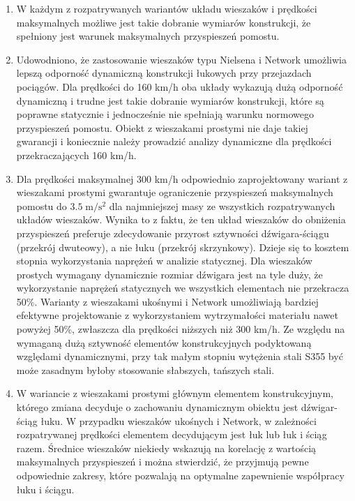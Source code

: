 \begin{enumerate}
	
\item W każdym z rozpatrywanych wariantów układu wieszaków i prędkości maksymalnych możliwe jest takie dobranie wymiarów konstrukcji, że spełniony jest warunek maksymalnych przyspieszeń pomostu.
	
\item Udowodniono, że zastosowanie wieszaków typu Nielsena i Network umożliwia lepszą odporność dynamiczną konstrukcji łukowych przy przejazdach pociągów. Dla prędkości do 160 km/h oba układy wykazują dużą odporność dynamiczną i trudne jest takie dobranie wymiarów konstrukcji, które są poprawne statycznie i jednocześnie nie spełniają warunku normowego przyspieszeń pomostu. Obiekt z wieszakami prostymi nie daje takiej gwarancji i koniecznie należy prowadzić analizy dynamiczne dla prędkości przekraczających 160 km/h. 

\item Dla prędkości maksymalnej 300 km/h odpowiednio zaprojektowany wariant z wieszakami prostymi gwarantuje ograniczenie przyspieszeń maksymalnych pomostu do $3.5\;\mathrm{m/s^2}$ dla najmniejszej masy ze wszystkich rozpatrywanych układów wieszaków. Wynika to z faktu, że ten układ wieszaków do obniżenia przyspieszeń preferuje zdecydowanie przyrost sztywności dźwigara-ściągu (przekrój dwuteowy), a nie łuku (przekrój skrzynkowy). Dzieje się to kosztem stopnia wykorzystania naprężeń w analizie statycznej. Dla wieszaków prostych wymagany dynamicznie rozmiar dźwigara jest na tyle duży, że wykorzystanie naprężeń statycznych we wszystkich elementach nie przekracza 50\%. Warianty z wieszakami ukośnymi i Network umożliwiają bardziej efektywne projektowanie z wykorzystaniem wytrzymałości materiału nawet powyżej 50\%, zwłaszcza dla prędkości niższych niż 300 km/h. Ze względu na wymaganą dużą sztywność elementów konstrukcyjnych podyktowaną względami dynamicznymi, przy tak małym stopniu wytężenia stali S355 być może zasadnym byłoby stosowanie słabszych, tańszych stali.

\item W wariancie z wieszakami prostymi głównym elementem konstrukcyjnym, którego zmiana decyduje o zachowaniu dynamicznym obiektu jest dźwigar-ściąg łuku. W przypadku wieszaków ukośnych i Network, w zależności rozpatrywanej prędkości elementem decydującym jest łuk lub łuk i ściąg razem. Średnice wieszaków niekiedy wskazują na korelację z wartością maksymalnych przyspieszeń i można stwierdzić, że przyjmują pewne odpowiednie zakresy, które pozwalają na optymalne zapewnienie współpracy łuku i ściągu. 
\end{enumerate}

